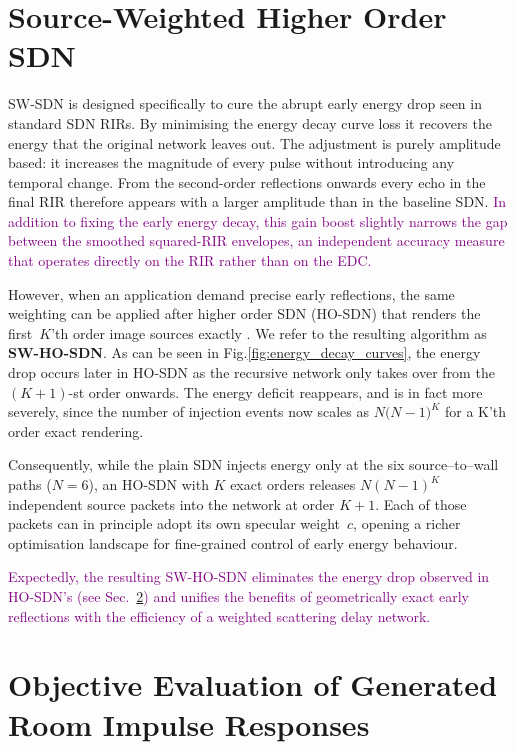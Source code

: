 \documentclass[journal]{IEEEtran}
\begin{document}
\section{Source-Weighted Higher Order SDN}
\label{sec:HO-SW-SDN}

SW-SDN is designed specifically to cure the abrupt early energy drop
seen in standard SDN RIRs. By minimising the energy decay curve loss it
recovers the energy that the original network leaves out. The
adjustment is purely amplitude based: it increases the magnitude of every pulse
without introducing any temporal change. From the second-order reflections onwards every echo in the final RIR therefore appears with a larger amplitude than in the baseline SDN. \textcolor{purple}{In addition to fixing the early energy decay, this gain boost slightly narrows the gap between the smoothed
squared-RIR envelopes, an independent accuracy measure that operates
directly on the RIR rather than on the EDC.}

However, when an application demand precise early reflections, the same
weighting can be applied after higher order SDN (HO-SDN)
that renders the first~$K$'th order image sources exactly
\cite{SDNwaspaa}. We refer to the resulting algorithm as
\textbf{SW-HO-SDN}. As can be seen in Fig.\ref{fig:energy_decay_curves},  the energy drop occurs later in HO-SDN as the recursive network only takes over from the $(K\!+\!1)$-st order onwards. The energy deficit reappears, and is in fact more severely, since the number of injection events now scales as $N\bigl(N-1\bigr)^{K}$ for a K'th order exact rendering. 

Consequently, while the plain SDN injects energy only at the six
source–to–wall paths ($N\!=\!6$), an HO-SDN with
$K$ exact orders releases
$N(N-1)^{K}$ independent source packets into the
network at order $K\!+\!1$.  
Each of those packets can in principle adopt its own
specular weight~$c$, opening a richer optimisation landscape for
fine-grained control of early energy behaviour.

\textcolor{purple}{Expectedly, the resulting SW-HO-SDN eliminates the energy drop observed
in HO-SDN's \cite{SDNwaspaa} (see Sec.~\ref{sec:results}) and unifies
the benefits of geometrically exact early reflections with the
efficiency of a weighted scattering delay
network.}

\section{Objective Evaluation of Generated Room Impulse Responses}
\label{sec:results}
\end{document}
